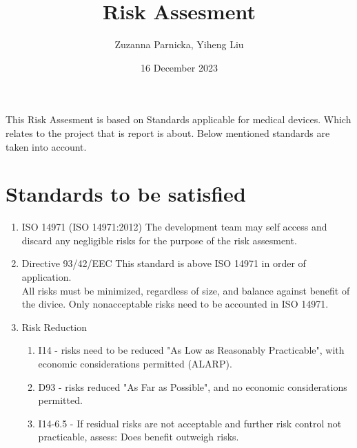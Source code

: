 \documentclass{article}[10pt]
\title{Risk Assesment}
\author{Zuzanna Parnicka, Yiheng Liu}
\date{16 December 2023}
\begin{document}
\maketitle
This Risk Assesment is based on Standards applicable for medical devices. Which relates to the project that is report is about.
Below mentioned standards are taken into account.
\section{Standards to be satisfied}
\begin{enumerate}
    \item ISO 14971 (ISO 14971:2012)
    The development team may self access and discard any negligible risks for the purpose of the risk assesment.
    \item Directive 93/42/EEC
    This standard is above ISO 14971 in order of application.\\
    All risks must be minimized, regardless of size, and balance against benefit of the divice. Only nonacceptable risks need to be accounted in ISO 14971.
    \item Risk Reduction
    \begin{enumerate}
        \item I14 - risks need to be reduced "As Low as Reasonably Practicable", with economic considerations permitted (ALARP).
        \item D93 - risks reduced "As Far as Possible", and no economic considerations permitted.
        \item I14-6.5 - If residual risks are not acceptable and further risk control not practicable, assess: Does benefit outweigh risks.
    \end{enumerate}
\end{enumerate}
\end{document}

